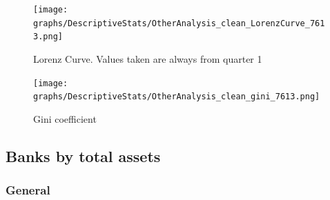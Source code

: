 \documentclass[12pt, a4paper]{article} %
\begin{document}
\begin{figure}[H]
\begin{minipage}{\textwidth}
\texttt{[image: graphs/DescriptiveStats/OtherAnalysis\_clean\_LorenzCurve\_7613.png]}
\caption[1]{Lorenz Curve. Values taken are always from quarter 1}
\label{fig:lorenz}
\end{minipage}
\end{figure}


\begin{figure}[H]
\begin{minipage}{\textwidth}
\texttt{[image: graphs/DescriptiveStats/OtherAnalysis\_clean\_gini\_7613.png]}
\centering
\caption[1]{Gini coefficient}
\label{fig:gini}
\end{minipage}
\end{figure}




\subsection{Banks by total assets}
\label{sec:banksByAssetSize}

\subsubsection{General}
\end{document}

